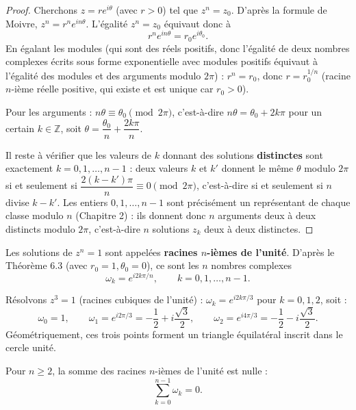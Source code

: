 \documentclass[a4paper,12pt,openany]{book}
\begin{document}
\begin{proof}
Cherchons $z=re^{i\theta}$ (avec $r>0$) tel que $z^n=z_0$. D'après la
formule de Moivre, $z^n = r^n e^{in\theta}$. L'égalité $z^n=z_0$
équivaut donc à
\[
r^n e^{in\theta} = r_0 e^{i\theta_0}.
\]
En égalant les modules (qui sont des réels positifs, donc l'égalité de
deux nombres complexes écrits sous forme exponentielle avec modules
positifs équivaut à l'égalité des modules et des arguments modulo
$2\pi$) : $r^n = r_0$, donc $r = r_0^{1/n}$ (racine $n$-ième réelle
positive, qui existe et est unique car $r_0>0$).

Pour les arguments : $n\theta \equiv \theta_0 \pmod{2\pi}$, c'est-à-dire
$n\theta = \theta_0+2k\pi$ pour un certain $k\in\mathbb{Z}$, soit
$\theta = \dfrac{\theta_0}{n}+\dfrac{2k\pi}{n}$.

Il reste à vérifier que les valeurs de $k$ donnant des solutions
\textbf{distinctes} sont exactement $k=0,1,\dots,n-1$ : deux valeurs
$k$ et $k'$ donnent le même $\theta$ modulo $2\pi$ si et seulement si
$\dfrac{2(k-k')\pi}{n} \equiv 0 \pmod{2\pi}$, c'est-à-dire si et
seulement si $n$ divise $k-k'$. Les entiers $0,1,\dots,n-1$ sont
précisément un représentant de chaque classe modulo $n$ (Chapitre 2) :
ils donnent donc $n$ arguments deux à deux distincts modulo $2\pi$,
c'est-à-dire $n$ solutions $z_k$ deux à deux distinctes.
\end{proof}

\begin{definition}
Les solutions de $z^n=1$ sont appelées \textbf{racines $n$-ièmes de
l'unité}. D'après le Théorème 6.3 (avec $r_0=1,\theta_0=0$), ce sont les
$n$ nombres complexes
\[
\omega_k = e^{i2k\pi/n}, \qquad k=0,1,\dots,n-1.
\]
\end{definition}

\begin{exemple}[6.4]
Résolvons $z^3=1$ (racines cubiques de l'unité) : $\omega_k =
e^{i2k\pi/3}$ pour $k=0,1,2$, soit :
\[
\omega_0 = 1, \qquad \omega_1 = e^{i2\pi/3} = -\frac12+i\frac{\sqrt3}{2},
\qquad \omega_2 = e^{i4\pi/3} = -\frac12-i\frac{\sqrt3}{2}.
\]
Géométriquement, ces trois points forment un triangle équilatéral inscrit
dans le cercle unité.
\end{exemple}

\begin{proposition}
Pour $n\geq2$, la somme des racines $n$-ièmes de l'unité est nulle :
\[
\sum_{k=0}^{n-1} \omega_k = 0.
\]
\end{proposition}
\end{document}
